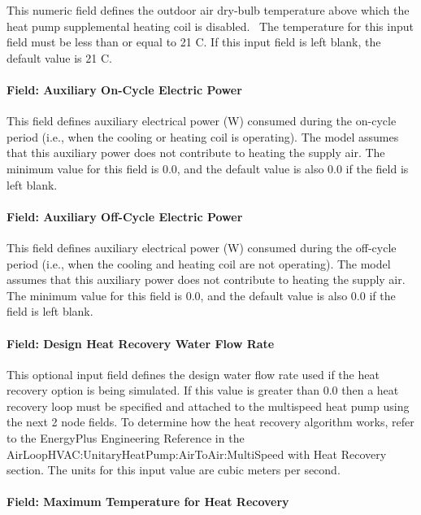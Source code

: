 This numeric field defines the outdoor air dry-bulb temperature above which the heat pump supplemental heating coil is disabled.~ The temperature for this input field must be less than or equal to 21 C. If this input field is left blank, the default value is 21 C.

\paragraph{Field: Auxiliary On-Cycle Electric Power}\label{field-auxiliary-on-cycle-electric-power}

This field defines auxiliary electrical power (W) consumed during the on-cycle period (i.e., when the cooling or heating coil is operating). The model assumes that this auxiliary power does not contribute to heating the supply air. The minimum value for this field is 0.0, and the default value is also 0.0 if the field is left blank.

\paragraph{Field: Auxiliary Off-Cycle Electric Power}\label{field-auxiliary-off-cycle-electric-power}

This field defines auxiliary electrical power (W) consumed during the off-cycle period (i.e., when the cooling and heating coil are not operating). The model assumes that this auxiliary power does not contribute to heating the supply air. The minimum value for this field is 0.0, and the default value is also 0.0 if the field is left blank.

\paragraph{Field: Design Heat Recovery Water Flow Rate}\label{field-design-heat-recovery-water-flow-rate-1-001}

This optional input field defines the design water flow rate used if the heat recovery option is being simulated. If this value is greater than 0.0 then a heat recovery loop must be specified and attached to the multispeed heat pump using the next 2 node fields. To determine how the heat recovery algorithm works, refer to the EnergyPlus Engineering Reference in the AirLoopHVAC:UnitaryHeatPump:AirToAir:MultiSpeed with Heat Recovery section. The units for this input value are cubic meters per second.

\paragraph{Field: Maximum Temperature for Heat Recovery}\label{field-maximum-temperature-for-heat-recovery-1}

